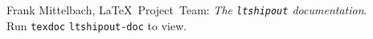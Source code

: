 \documentclass{ltnews}
\providecommand\Dash {\unskip \textemdash}
\begin{document}

\begin{thebibliography}{9}

\fontsize{9.3}{11.3}\selectfont

 Frank Mittelbach, \LaTeX{}~Project~Team:
  \emph{The \texttt{\upshape ltshipout} documentation}.\\
  Run \texttt{texdoc} \texttt{ltshipout-doc} to view.



%
%
%
%
%
\end{thebibliography}
\end{document}

